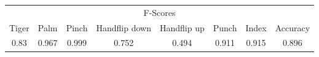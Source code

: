 \documentclass{standalone}
\begin{document}
 
 \begin{tabular}{|c|c|c|c|c|c|c ||c|}
\cline{1-8}\multicolumn{8}{|c|}{F-Scores} \\ 
\cline{1-8}Tiger & Palm & Pinch & Handflip down & Handflip up & Punch & Index & Accuracy\\ 
\cline{1-8}0.83 & 0.967 & 0.999 & 0.752 & 0.494 & 0.911 & 0.915 & 0.896\\ 
 \cline{1-8}\hline \end{tabular}
 
\end{document}
